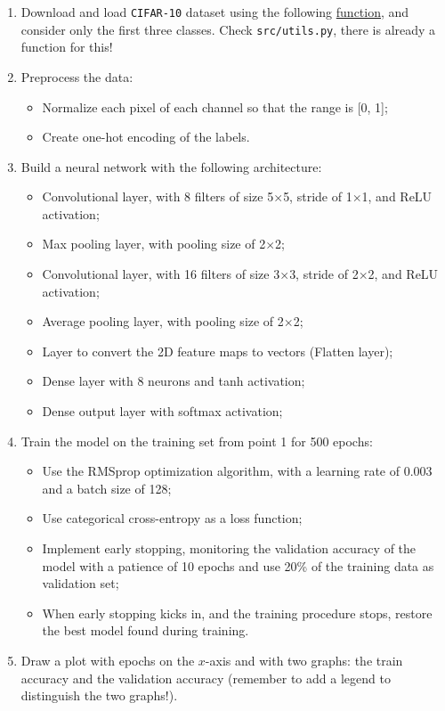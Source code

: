 \documentclass[11pt]{scrartcl}
\begin{document}
\begin{enumerate}
\item Download and load \texttt{CIFAR-10} dataset using the following \href{https://www.tensorflow.org/api_docs/python/tf/keras/datasets/cifar10/load_data}{function}, and consider only the first three classes. Check \texttt{src/utils.py}, there is already a function for this!
\item Preprocess the data:
\begin{itemize}
\item Normalize each pixel of each channel so that the range is [0, 1];
\item Create one-hot encoding of the labels.
\end{itemize}
\item Build a neural network with the following architecture:
\begin{itemize}
\item Convolutional layer, with 8 filters of size 5$\times$5, stride of 1$\times$1, and ReLU activation;
\item Max pooling layer, with pooling size of 2$\times$2;
\item Convolutional layer, with 16 filters of size 3$\times$3, stride of 2$\times$2, and ReLU activation;
\item Average pooling layer, with pooling size of 2$\times$2;
\item Layer to convert the 2D feature maps to vectors (Flatten layer);
\item Dense layer with 8 neurons and tanh activation;
\item Dense output layer with softmax activation;
\end{itemize}
\item Train the model on the training set from point 1 for 500 epochs:
\begin{itemize}
\item Use the RMSprop optimization algorithm, with a learning rate of 0.003 and a batch size of 128;
\item Use categorical cross-entropy as a loss function;
\item Implement early stopping, monitoring the validation accuracy of the model with a patience of 10 epochs and use 20\% of the training data as validation set;
\item When early stopping kicks in, and the training procedure stops, restore the best model found during training.
\end{itemize}
\item Draw a plot with epochs on the $x$-axis and with two graphs: the train accuracy and the validation accuracy (remember to add a legend to distinguish the two graphs!).

\end{enumerate}
\end{document}
